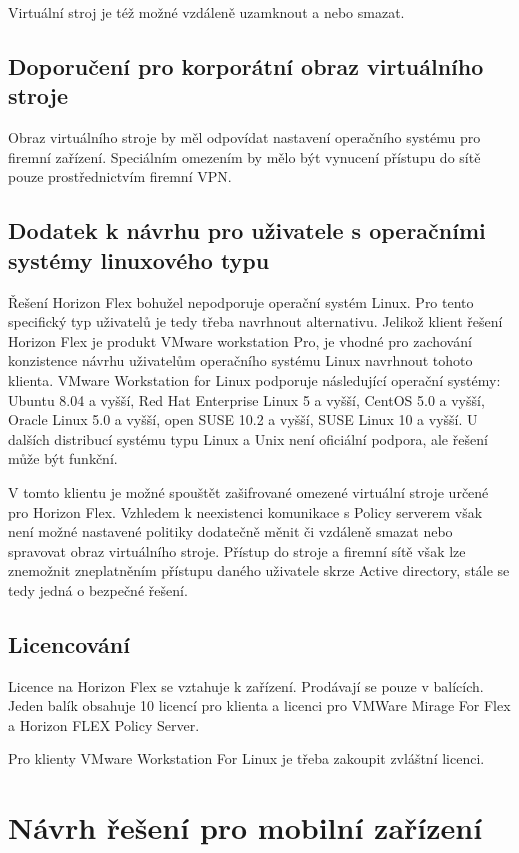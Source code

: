 Virtuální stroj je též možné vzdáleně uzamknout a nebo smazat.

\subsection{Doporučení pro korporátní obraz virtuálního stroje}
Obraz virtuálního stroje by měl odpovídat nastavení operačního systému pro firemní zařízení. Speciálním omezením by mělo být vynucení přístupu do sítě pouze prostřednictvím firemní VPN.

\subsection{Dodatek k návrhu pro uživatele s operačními systémy linuxového typu}
Řešení Horizon Flex bohužel nepodporuje operační systém Linux. Pro tento specifický typ uživatelů je tedy třeba navrhnout alternativu. Jelikož klient řešení Horizon Flex je produkt VMware workstation Pro, je vhodné pro zachování konzistence návrhu uživatelům operačního systému Linux navrhnout tohoto klienta. VMware Workstation for Linux podporuje následující operační systémy: Ubuntu 8.04 a vyšší, Red Hat Enterprise Linux 5 a vyšší, CentOS 5.0 a vyšší, Oracle Linux 5.0 a vyšší, open SUSE 10.2 a vyšší, SUSE Linux 10 a vyšší. U dalších distribucí systému typu Linux a Unix není oficiální podpora, ale řešení může být funkční.

V tomto klientu je možné spouštět zašifrované omezené virtuální stroje určené pro Horizon Flex. Vzhledem k neexistenci komunikace s Policy serverem však není možné nastavené politiky dodatečně měnit či vzdáleně smazat nebo spravovat obraz virtuálního stroje. Přístup do stroje a firemní sítě však lze znemožnit zneplatněním přístupu daného uživatele skrze Active directory, stále se tedy jedná o bezpečné řešení.

\subsection{Licencování}
Licence na Horizon Flex se vztahuje k zařízení. Prodávají se pouze v balících. Jeden balík obsahuje 10 licencí pro klienta a licenci pro VMWare Mirage For Flex a Horizon FLEX Policy Server.

Pro klienty VMware Workstation For Linux je třeba zakoupit zvláštní licenci.


\section{Návrh řešení pro mobilní zařízení}


